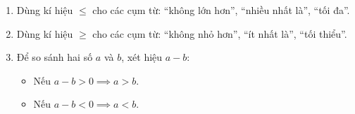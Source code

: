 \begin{enumerate}
\item Dùng kí hiệu $\le$ cho các cụm từ: ``không lớn hơn'', ``nhiều nhất là'', ``tối đa''.
\item Dùng kí hiệu $\ge$ cho các cụm từ: ``không nhỏ hơn'', ``ít nhất là'', ``tối thiểu''.
\item Để so sánh hai số $a$ và $b$, xét hiệu $a - b$:
\begin{itemize}
\item Nếu $a - b > 0 \implies a > b$.
\item Nếu $a - b < 0 \implies a < b$.
\end{itemize}
\end{enumerate}
